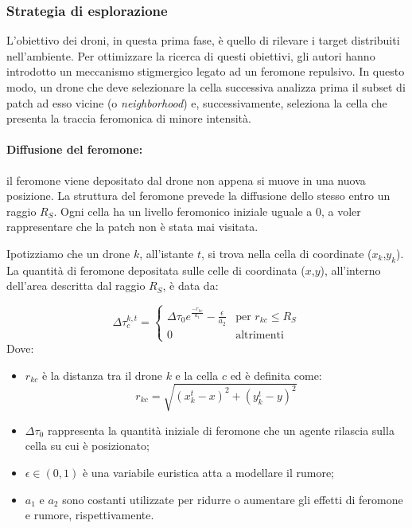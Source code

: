 \subsubsection{Strategia di esplorazione} \label{esplorazione_paper}

L'obiettivo dei droni, in questa prima fase, è quello di rilevare i target distribuiti nell'ambiente.
Per ottimizzare la ricerca di questi obiettivi, gli autori hanno introdotto un meccanismo stigmergico legato ad un feromone repulsivo.
In questo modo, un drone che deve selezionare la cella successiva analizza prima il subset di patch ad esso vicine (o \textit{neighborhood}) e, successivamente, seleziona la cella che presenta la traccia feromonica di minore intensità.

\paragraph{Diffusione del feromone:} il feromone viene depositato dal drone non appena si muove in una nuova posizione.
La struttura del feromone prevede la diffusione dello stesso entro un raggio $R_S$.
Ogni cella ha un livello feromonico iniziale uguale a 0, a voler rappresentare che la patch non è stata mai visitata.

Ipotizziamo che un drone $k$, all'istante $t$, si trova nella cella di coordinate ($x_k$,$y_k$).
La quantità di feromone depositata sulle celle di coordinata ($x$,$y$), all'interno dell'area descritta dal raggio $R_S$, è data da:

\begin{equation}
    \Delta\tau_{c}^{k,t} = 
    \begin{cases}
        \Delta\tau_{0}e^{\frac{-r_{kc}}{a_1}} - \frac{\epsilon}{a_2} &\text{per $r_{kc} \leq R_S$}\\
        0 &\text{altrimenti}
    \end{cases}
\end{equation}
Dove:
\begin{itemize}
    \item $r_{kc}$ è la distanza tra il drone $k$ e la cella $c$ ed è definita come:
    \begin{equation}
        r_{kc} = \sqrt{(x^{t}_{k} - x)^{2} + (y^{t}_{k} - y)^{2}}
    \end{equation}
    \item $\Delta\tau_{0}$ rappresenta la quantità iniziale di feromone che un agente rilascia sulla cella su cui è posizionato;
    \item $\epsilon \in (0,1)$ è una variabile euristica atta a modellare il rumore;
    \item $a_{1}$ e $a_{2}$ sono costanti utilizzate per ridurre o aumentare gli effetti di feromone e rumore, rispettivamente. 
\end{itemize} 

